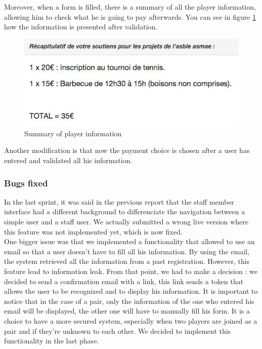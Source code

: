 \documentclass[a4paper, 12pt]{article}
\begin{document}
Moreover, when a form is filled, there is a summary of all the player information, allowing him to check what he is going to pay afterwards. You can see in figure \ref{recap} how the information is presented after validation.

\begin{figure}[h]
  \caption{\label{recap} Summary of player information}
  \includegraphics[scale=0.7]{recap.png}
\end{figure}

Another modification is that now the payment choice is chosen after a user has entered and validated all his information.
\subsubsection*{Bugs fixed}
In the last sprint, it was said in the previous report that the staff member interface had a different background to differenciate the navigation between a simple user and a staff user. We actually submitted a wrong live version where this feature was not implemented yet, which is now fixed.\\

One bigger issue was that we implemented a functionality that allowed to use an email so that a user doesn't have to fill all his information. By using the email, the system retrieved all the information from a past registration. However, this feature lead to information leak. From that point, we had to make a decision : we decided to send a confirmation email with a link, this link sends a token that allows the user to be recognized and to display his information. It is important to notice that in the case of a pair, only the information of the one who entered his email will be displayed, the other one will have to manually fill his form. It is a choice to have a more secured system, especially when two players are joined as a pair and if they're unknown to each other. We decided to implement this functionality in the last phase.\\
\end{document}
